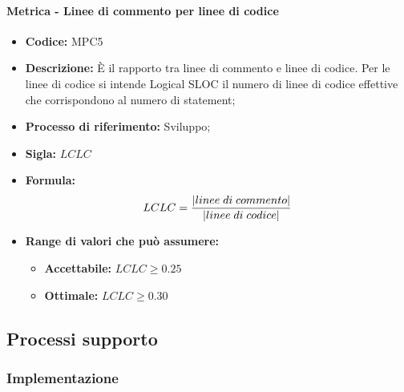     \paragraph{Metrica - Linee di commento per linee di codice}
    \begin{itemize}
        \item \textbf{Codice:} MPC5
        \item \textbf{Descrizione:} È il rapporto tra linee di commento e linee di codice. Per le linee di codice si intende Logical SLOC il numero di linee di codice effettive che corrispondono al numero di statement;
        \item \textbf{Processo di riferimento:} Sviluppo;
        \item \textbf{Sigla:} $LCLC$
        \item \textbf{Formula:}$$LCLC = {|linee \; di \; commento| \over |linee \; di \; codice|}$$
        \item \textbf{Range di valori che può assumere:}
        \begin{itemize}
            \item \textbf{Accettabile:} $LCLC \geq 0.25$
            \item \textbf{Ottimale:} $LCLC \geq 0.30$
        \end{itemize}
    \end{itemize}

\subsection{Processi supporto}

\subsubsection{Implementazione}
